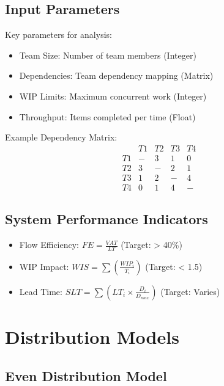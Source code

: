 \documentclass[12pt,a4paper]{article}
\newenvironment{definition}[1]
{\begin{mdframed}[style=definitionstyle,frametitle={Definition: #1}]}
{\end{mdframed}}
\begin{document}
\subsection{Input Parameters}

\begin{definition}{Input Parameters}
Key parameters for analysis:
\begin{itemize}
    \item Team Size: Number of team members (Integer)
    \item Dependencies: Team dependency mapping (Matrix)
    \item WIP Limits: Maximum concurrent work (Integer)
    \item Throughput: Items completed per time (Float)
\end{itemize}

Example Dependency Matrix:
\[
\begin{matrix}
    & T1 & T2 & T3 & T4 \\
T1 & - & 3 & 1 & 0 \\
T2 & 3 & - & 2 & 1 \\
T3 & 1 & 2 & - & 4 \\
T4 & 0 & 1 & 4 & -
\end{matrix}
\]
\end{definition}

\subsection{System Performance Indicators}

\begin{definition}{Performance Metrics}
\begin{itemize}
    \item Flow Efficiency: $FE = \frac{VAT}{LT}$ (Target: > 40\%)
    \item WIP Impact: $WIS = \sum(\frac{WIP_i}{T_i})$ (Target: < 1.5)
    \item Lead Time: $SLT = \sum(LT_i \times \frac{D_i}{D_{max}})$ (Target: Varies)
\end{itemize}
\end{definition}

\section{Distribution Models}

\subsection{Even Distribution Model}
\end{document}
